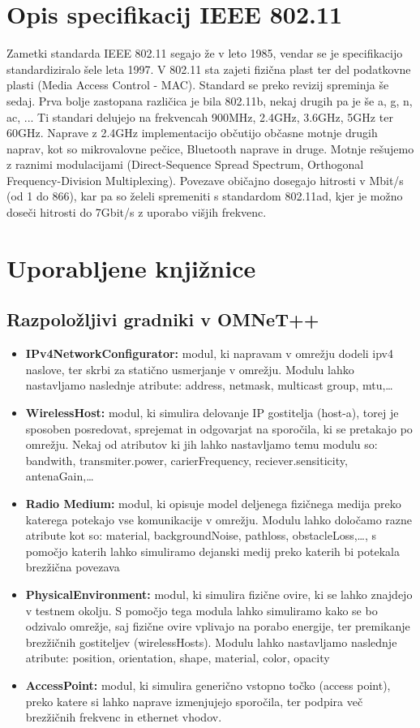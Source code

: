 \documentclass[11pt,a4paper,slovene]{myarticle}
\begin{document}
\section{Opis specifikacij IEEE 802.11}
Zametki standarda IEEE 802.11 segajo že v leto 1985, vendar se je specifikacijo standardiziralo šele leta 1997. V 802.11 sta zajeti fizična plast ter del podatkovne plasti (Media Access Control - MAC). Standard se preko revizij spreminja še sedaj. Prva bolje zastopana različica je bila 802.11b, nekaj drugih pa je še a, g, n, ac, ... Ti standari delujejo na frekvencah 900MHz, 2.4GHz, 3.6GHz, 5GHz ter 60GHz. Naprave z 2.4GHz implementacijo občutijo občasne motnje drugih naprav, kot so mikrovalovne pečice, Bluetooth naprave in druge. Motnje rešujemo z raznimi modulacijami (Direct-Sequence Spread Spectrum, Orthogonal Frequency-Division Multiplexing). Povezave običajno dosegajo hitrosti v Mbit/s (od 1 do 866), kar pa so želeli spremeniti s standardom 802.11ad, kjer je možno doseči hitrosti do 7Gbit/s z uporabo višjih frekvenc.

\section{Uporabljene knjižnice}

\subsection{Razpoložljivi gradniki v OMNeT++}
\begin{itemize}
	\item \textbf{IPv4NetworkConfigurator:} modul, ki napravam v omrežju dodeli ipv4 naslove, ter skrbi za statično usmerjanje v omrežju. Modulu lahko nastavljamo naslednje atribute: address, netmask, multicast group, mtu,…
	\item \textbf{WirelessHost:} modul, ki simulira delovanje IP gostitelja (host-a), torej je sposoben posredovat, sprejemat in odgovarjat na sporočila, ki se pretakajo po omrežju. Nekaj od atributov ki jih lahko nastavljamo temu modulu so: bandwith,  transmiter.power, carierFrequency, reciever.sensiticity, antenaGain,…
	\item \textbf{Radio Medium:} modul, ki opisuje model deljenega fizičnega medija preko katerega potekajo vse komunikacije v omrežju. Modulu lahko določamo razne atribute kot so: material, backgroundNoise, pathloss, obstacleLoss,…, s pomočjo katerih lahko simuliramo dejanski medij preko katerih bi potekala brezžična povezava
	\item \textbf{PhysicalEnvironment:} modul, ki simulira fizične ovire, ki se lahko znajdejo v testnem okolju. S pomočjo tega modula lahko simuliramo kako se bo odzivalo omrežje, saj fizične ovire vplivajo na porabo energije, ter premikanje brezžičnih gostiteljev (wirelessHosts). Modulu lahko nastavljamo naslednje atribute: position, orientation, shape, material, color, opacity
	\item \textbf{AccessPoint:} modul, ki simulira generično vstopno točko (access point), preko katere si lahko naprave izmenjujejo sporočila, ter podpira več brezžičnih frekvenc in ethernet vhodov.
\end{itemize}
\end{document}
